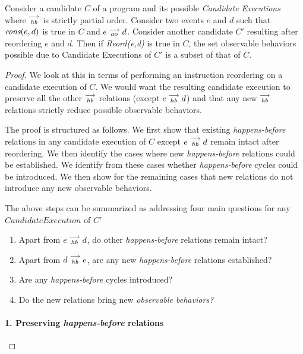 \begin{theorem} 

    Consider a candidate $C$ of a program and its possible \textit{Candidate Executions} where $\stackrel{\longrightarrow}{_\textit{hb}}$ is strictly partial order. Consider two events $e$ and $d$ such that $\textit{cons}(e,d)$ is true in $C$ and  $e\stackrel{\longrightarrow}{_{ao}}d$. Consider another candidate $C'$ resulting after reordering $e$ and $d$. 
    Then if \emph{Reord(e,d)} is true in $C$, the set observable behaviors possible due to Candidate Executions of $C'$ is a subset of that of $C$. 
\end{theorem}

\begin{proof}

    We look at this in terms of performing an instruction reordering on a candidate execution of $C$. We would want the resulting candidate execution to preserve all the other $\stackrel{\longrightarrow}{_{hb}}$ relations (except $e\stackrel{\longrightarrow}{_{hb}}d$) and that any new $\stackrel{\longrightarrow}{_{hb}}$ relations strictly reduce possible observable behaviors.
    
    The proof is structured as follows. We first show that existing \textit{happens-before} relations in any candidate execution of $C$ except $e\stackrel{\longrightarrow}{_{hb}}d$ remain intact after reordering. We then identify the cases where new \textit{happens-before} relations could be established. We identify from these cases whether \textit{happens-before} cycles could be introduced.
    We then show for the remaining cases that new relations do not introduce any new observable behaviors.

    The above steps can be summarized as addressing four main questions for any $Candidate Execution$ of $C'$
    \begin{enumerate}
        \item Apart from $e\stackrel{\longrightarrow}{_{hb}}d$, do other \emph{happens-before} relations remain intact?
        \item Apart from $d\stackrel{\longrightarrow}{_{hb}}e$, are any new \emph{happens-before} relations established? 
        \item Are any \emph{happens-before} cycles introduced? 
        \item Do the new relations bring new \emph{observable behaviors?}
    \end{enumerate}
    
    
    \paragraph{1. Preserving \textit{happens-before} relations}
        

\end{proof}
